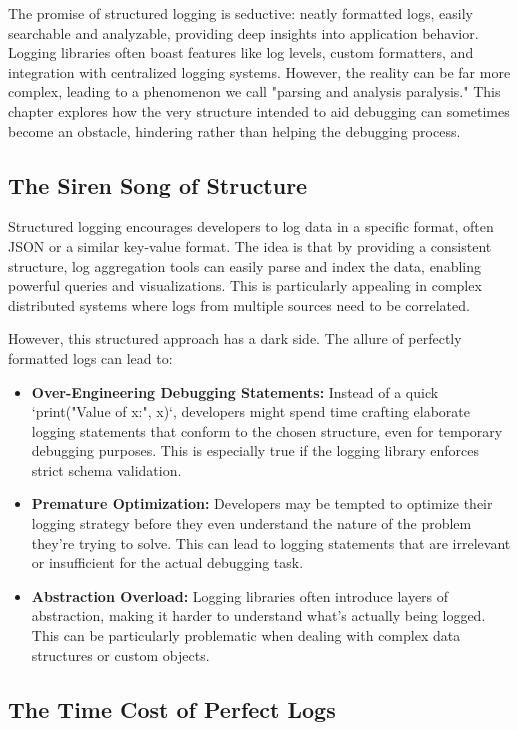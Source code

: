 \documentclass{article}
\begin{document}
{{{{The promise of structured logging is seductive: neatly formatted logs, easily searchable and analyzable, providing deep insights into application behavior. Logging libraries often boast features like log levels, custom formatters, and integration with centralized logging systems. However, the reality can be far more complex, leading to a phenomenon we call "parsing and analysis paralysis." This chapter explores how the very structure intended to aid debugging can sometimes become an obstacle, hindering rather than helping the debugging process.

\subsection*{The Siren Song of Structure}

Structured logging encourages developers to log data in a specific format, often JSON or a similar key-value format. The idea is that by providing a consistent structure, log aggregation tools can easily parse and index the data, enabling powerful queries and visualizations. This is particularly appealing in complex distributed systems where logs from multiple sources need to be correlated.

However, this structured approach has a dark side. The allure of perfectly formatted logs can lead to:

\begin{itemize}
    \item \textbf{Over-Engineering Debugging Statements:} Instead of a quick `print("Value of x:", x)`, developers might spend time crafting elaborate logging statements that conform to the chosen structure, even for temporary debugging purposes. This is especially true if the logging library enforces strict schema validation.
    \item \textbf{Premature Optimization:} Developers may be tempted to optimize their logging strategy before they even understand the nature of the problem they're trying to solve. This can lead to logging statements that are irrelevant or insufficient for the actual debugging task.
    \item \textbf{Abstraction Overload:} Logging libraries often introduce layers of abstraction, making it harder to understand what's actually being logged. This can be particularly problematic when dealing with complex data structures or custom objects.
\end{itemize}

\subsection*{The Time Cost of Perfect Logs}

}}}}
\end{document}
